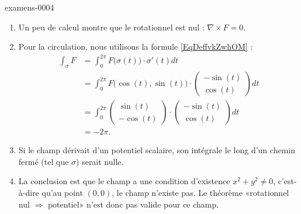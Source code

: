 
\begin{corrige}{examens-0004}

    \begin{enumerate}
        \item
            Un peu de calcul montre que le rotationnel est nul : \( \nabla \times F=0\).
        \item
            Pour la circulation, nous utilisons la formule \eqref{EqDeffvkZwhOM} :
            \begin{subequations}
                \begin{align}
                    \int_{\sigma}F&=\int_0^{2\pi} F\big( \sigma(t) \big)\cdot \sigma'(t)dt\\
                    &=\int_0^{2\pi}F\big( \cos(t),\sin(t) \big)\cdot\begin{pmatrix}
                        -\sin(t)    \\ 
                        \cos(t)    
                    \end{pmatrix}dt\\
                    &=\int_0^{2\pi}\begin{pmatrix}
                        \sin(t)    \\ 
                        -\cos(t)    
                    \end{pmatrix}\cdot
                    \begin{pmatrix}
                        -\sin(t)    \\ 
                        \cos(t)    
                    \end{pmatrix}dt\\
                    &=-2\pi.
                \end{align}
            \end{subequations}
        \item
            Si le champ dérivait d'un potentiel scalaire, son intégrale le long d'un chemin fermé (tel que \( \sigma\)) serait nulle.
        \item
            La conclusion est que le champ a une condition d'existence \( x^2+y^2\neq 0\), c'est-à-dire qu'au point \( (0,0)\), le champ n'existe pas. Le théorème «rotationnel nul \( \Rightarrow\) potentiel» n'est donc pas valide pour ce champ.

    \end{enumerate}

\end{corrige}
